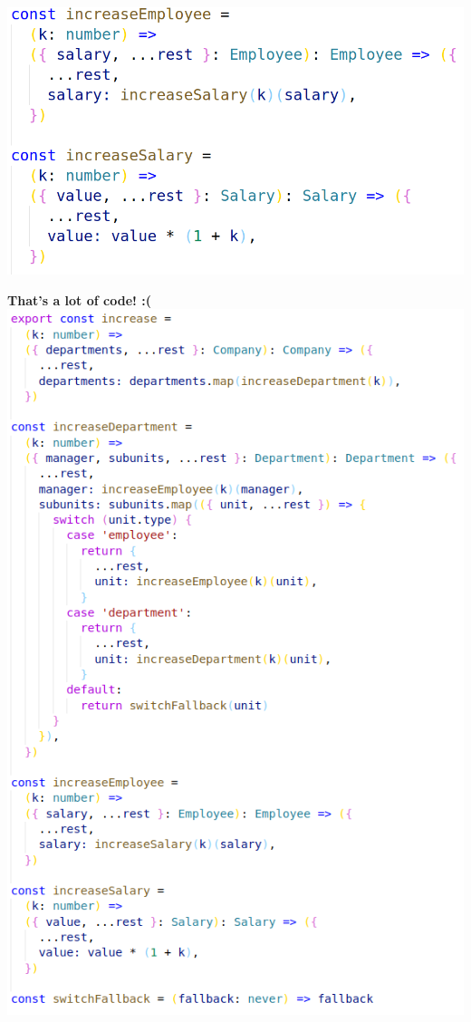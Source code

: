 \documentclass[14pt]{beamer}
\begin{document}
\begin{frame}
  \includegraphics[height=\textheight,width=\textwidth,keepaspectratio]{graphics/increase-naive-step3-ts.png}
\end{frame}

\begin{frame}
  \textbf{That's a lot of code! :(}
  \vfill
  \includegraphics[height=0.8\textheight,width=\textwidth,keepaspectratio]{graphics/increase-naive-ts.png}
\end{frame}
\end{document}
